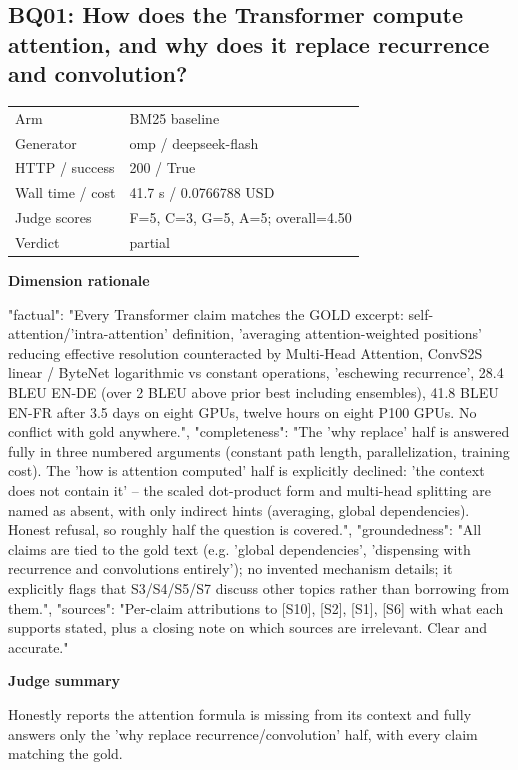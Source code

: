 \documentclass[10pt]{article}
\begin{document}
\subsection{BQ01: How does the Transformer compute attention, and why does it replace recurrence and convolution?}
\begin{tabular}{@{}ll@{}}
Arm & BM25 baseline\\
Generator & omp / deepseek-flash\\
HTTP / success & 200 / True\\
Wall time / cost & 41.7 s / 0.0766788 USD\\
Judge scores & F=5, C=3, G=5, A=5; overall=4.50\\
Verdict & partial\\
\end{tabular}

\textbf{Dimension rationale}
\begin{EvidenceText}
{
  "factual": "Every Transformer claim matches the GOLD excerpt: self-attention/'intra-attention' definition, 'averaging attention-weighted positions' reducing effective resolution counteracted by Multi-Head Attention, ConvS2S linear / ByteNet logarithmic vs constant operations, 'eschewing recurrence', 28.4 BLEU EN-DE (over 2 BLEU above prior best including ensembles), 41.8 BLEU EN-FR after 3.5 days on eight GPUs, twelve hours on eight P100 GPUs. No conflict with gold anywhere.",
  "completeness": "The 'why replace' half is answered fully in three numbered arguments (constant path length, parallelization, training cost). The 'how is attention computed' half is explicitly declined: 'the context does not contain it' -- the scaled dot-product form and multi-head splitting are named as absent, with only indirect hints (averaging, global dependencies). Honest refusal, so roughly half the question is covered.",
  "groundedness": "All claims are tied to the gold text (e.g. 'global dependencies', 'dispensing with recurrence and convolutions entirely'); no invented mechanism details; it explicitly flags that S3/S4/S5/S7 discuss other topics rather than borrowing from them.",
  "sources": "Per-claim attributions to [S10], [S2], [S1], [S6] with what each supports stated, plus a closing note on which sources are irrelevant. Clear and accurate."
}
\end{EvidenceText}

\textbf{Judge summary}
\begin{EvidenceText}
Honestly reports the attention formula is missing from its context and fully answers only the 'why replace recurrence/convolution' half, with every claim matching the gold.
\end{EvidenceText}
\end{document}
